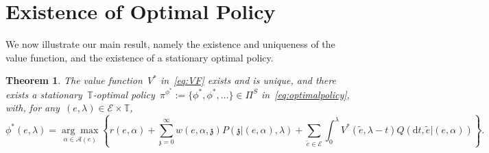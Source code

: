 \documentclass{amsart}[11pt]
\numberwithin{equation}{section}
\newtheorem{theorem}{Theorem}[section]
\theoremstyle{definition}
\newtheorem{remark}[theorem]{Remark}
\newcommand{\D}{\mathrm{d}}
\newcommand{\Ee}{\mathcal{E}}
\newcommand{\TT}{\mathbb{T}}
\newcommand{\zz}{\mathfrak{z}}
\newcommand{\Aa}{\mathcal{A}}
\begin{document}

\section{Existence of Optimal Policy}\label{Section:OptimalStrategy}
We now illustrate our main result, 
namely the existence and uniqueness of the value function,
and the existence of a stationary optimal policy.
\begin{theorem}\label{thm:ValueFunction}
The value function~$V^*$ in~\eqref{eq:VF} exists and is unique,
and
there exists a stationary~$\TT$-optimal policy~$\pi^{\phi^*} := \{\phi^*, \phi^*, \dots\}\in\Pi^S$
in~\eqref{eq:optimalpolicy}, with, for any~$(e, \lambda)\in\Ee\times\TT$,
\begin{equation}\label{eq:OptimalSPolicy}
\phi^*(e, \lambda) = \underset{\alpha\in\Aa(e)}{\arg\max}
\left\{
r(e,\alpha) + \sum_{\zz = 0}^\infty w(e, \alpha, \zz)P(\zz\lvert (e, \alpha), \lambda)
+\sum_{\tilde{e}\in \Ee}\int_0^\lambda V^*(\tilde{e}, \lambda - t)Q(\D t, \tilde{e}\lvert (e, \alpha))
\right\}.
\end{equation}
\end{theorem}
\end{document}
